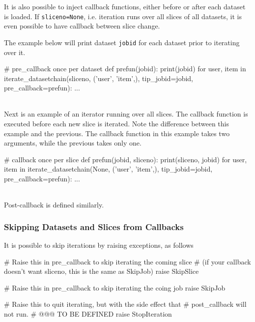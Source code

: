 It is also possible to inject callback functions, either before or
after each dataset is loaded.  If \texttt{sliceno=None},
i.e. iteration runs over all slices of all datasets, it is even
possible to have callback between slice change.

The example below will print dataset \texttt{jobid} for each dataset
prior to iterating over it.
\\
\begin{python}
# pre_callback once per dataset
def prefun(jobid):
    print(jobid)
for user, item in iterate_datasetchain(sliceno, ('user', 'item',), tip_jobid=jobid,
                                       pre_callback=prefun):
    ...
\end{python}
\\
Next is an example of an iterator running over all slices.
The callback function is executed before each new slice is iterated.
Note the difference between this example and the previous.  The
callback function in this example takes two arguments, while the
previous takes only one.

\begin{python}
# callback once per slice
def prefun(jobid, sliceno):
    print(sliceno, jobid)
for user, item in iterate_datasetchain(None, ('user', 'item',), tip_jobid=jobid,
                                       pre_callback=prefun):
    ...
\end{python}
\\
Post-callback is defined similarly.



\subsubsection*{Skipping Datasets and Slices from Callbacks}
It is possible to skip iterations by raising exceptions, as follows
\\
\begin{python}

# Raise this in pre_callback to skip iterating the coming slice
# (if your callback doesn't want sliceno, this is the same as SkipJob)
raise SkipSlice

# Raise this in pre_callback to skip iterating the coing job
raise SkipJob

# Raise this to quit iterating, but with the side effect that
# post_callback will not run.
# @@@ TO BE DEFINED
raise StopIteration
\end{python}
